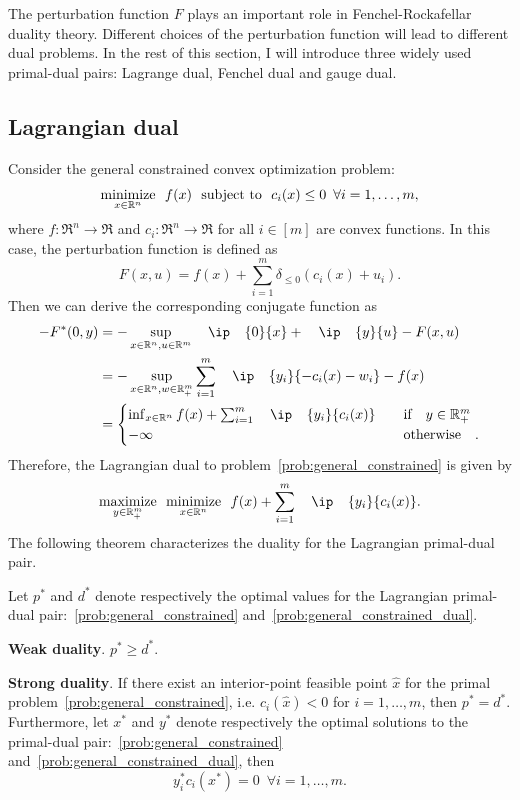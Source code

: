 The perturbation function $F$ plays an important role in Fenchel-Rockafellar duality theory. Different choices of the perturbation function will lead to different dual problems. In the rest of this section, I will introduce three widely used primal-dual pairs: Lagrange dual, Fenchel dual and gauge dual. 


\subsection{Lagrangian dual}
Consider the general constrained convex optimization problem:
\begin{equation} \label{prob:general_constrained} 
    \displaystyle\mathop{\hbox{\rm minimize}}_{x \in \mathbb{R}^n}\enspace f(x) \enspace\mathop{\hbox{\rm subject to}}\enspace c_i(x) \leq 0 \enspace \forall i = 1, \dots, m,
\end{equation}
where $f:\Re^n\to\Re$ and $c_i:\Re^n\to\Re$ for all $i\in[m]$ are convex functions. In this case, the perturbation function is defined as 
\begin{equation}
    F(x, u) = f(x) + \sum_{i = 1}^m \delta_{\leq 0}(c_i(x) + u_i).
\end{equation}
Then we can derive the corresponding conjugate function as 
\begin{align*}
    -F^*(0, y) &= -\sup_{x\in\Re^n, u\in\Re^m} \ip{0}{x} + \ip{y}{u} - F(x,u)
             \\&= -\sup_{x\in\Re^n, w\in\Re_+^m} \sum_{i=1}^m \ip{y_i}{- c_i(x) - w_i} - f(x)
             \\&= 
             \begin{cases}
                 \inf_{x\in\Re^n} f(x) + \sum_{i=1}^m \ip{y_i}{c_i(x)} & \text{if} y \in\Re_+^m \\
                 -\infty & \text{otherwise}.
             \end{cases}
\end{align*}
Therefore, the Lagrangian dual to problem~\eqref{prob:general_constrained} is given by
\begin{equation} \label{prob:general_constrained_dual}
    \maximize{y\in\Re_+^m} \minimize{x \in \Re^n} f(x) + \sum_{i=1}^m \ip{y_i}{c_i(x)}.
\end{equation}
The following theorem characterizes the duality for the Lagrangian primal-dual pair. 

\begin{theorem} 
    Let $p^*$ and $d^*$ denote respectively the optimal values for the Lagrangian primal-dual pair:~\eqref{prob:general_constrained} and~\eqref{prob:general_constrained_dual}. 
    \item \textbf{Weak duality}. $p^* \geq d^*$. 
    \item \textbf{Strong duality}. 
    If there exist an interior-point feasible point $\hat x$ for the primal problem~\eqref{prob:general_constrained}, i.e. $c_i(\hat x) < 0$ for $i = 1,\dots,m$, then $p^* = d^*$. Furthermore, let $x^*$ and $y^*$ denote respectively the optimal solutions to the primal-dual pair:~\eqref{prob:general_constrained} and~\eqref{prob:general_constrained_dual}, then 
    \[y_i^*c_i(x^*) = 0 \enspace \forall i = 1,\dots,m.\]
\end{theorem}


